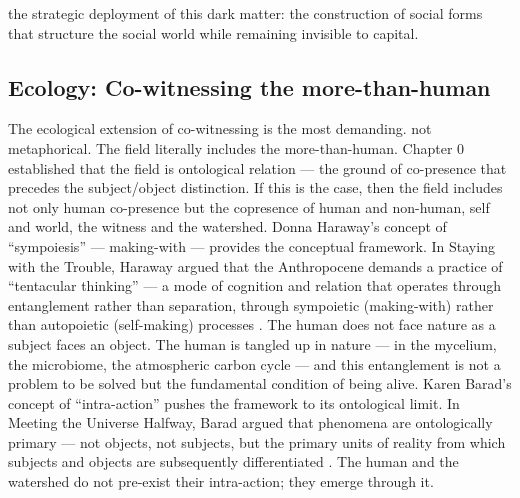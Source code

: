 the strategic deployment of this dark matter: the construction of social forms that structure the social world while remaining invisible to capital.

\subsection{Ecology: Co-witnessing the more-than-human}

The ecological extension of co-witnessing is the most demanding. not metaphorical. The field literally includes the more-than-human. Chapter 0 established that the field is ontological relation — the ground of co-presence that precedes the subject/object distinction. If this is the case, then the field includes not only human co-presence but the copresence of human and non-human, self and world, the witness and the watershed. Donna Haraway’s concept of “sympoiesis” — making-with — provides the conceptual framework. In Staying with the Trouble, Haraway argued that the Anthropocene demands a practice of “tentacular thinking” — a mode of cognition and relation that operates through entanglement rather than separation, through sympoietic (making-with) rather than autopoietic (self-making) processes \cite[pp.~31--66]{haraway_2016}. The human does not face nature as a subject faces an object. The human is tangled up in nature — in the mycelium, the microbiome, the atmospheric carbon cycle — and this entanglement is not a problem to be solved but the fundamental condition of being alive. Karen Barad’s concept of “intra-action” pushes the framework to its ontological limit. In Meeting the Universe Halfway, Barad argued that phenomena are ontologically primary — not objects, not subjects, but the primary units of reality from which subjects and objects are subsequently differentiated \cite[pp.~139-- 174]{barad_2007}. The human and the watershed do not pre-exist their intra-action; they emerge through it.

